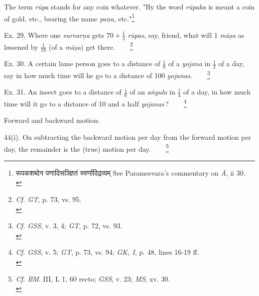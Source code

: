 \documentclass[10pt, openany]{book}
\begin{document}
{{{{{{{{{{{{{{{{{{{{\begin{sloppypar}
\newpage

{\small The term  \textit{rūpa} stands for any coin whatever. "By the word  \textit{rūpaka} is meant a coin of gold, etc., bearing the name  \textit{paṇa}, etc."\renewcommand{\thefootnote}{1}\footnote{\hspace{-2mm} {\s रूपकशब्देन पणादिसञ्ज्ञितं स्वर्णादिद्रव्यम्} {\en See Paramesvara's commentary on \textit{Ā}, ii 30.}\\}}
\vspace{3mm}

Ex. 29. Where one  \textit{survarṇa} gets $70 + \frac{1}{3}$  \textit{rūpas}, say,
friend, what will 1  \textit{māṣa} as lessened by $\frac{1}{10}$ (of a  \textit{māṣa}) get there.~\,~~~\renewcommand{\thefootnote}{\hspace{-4.5mm} 2}\footnote{\hspace{-2mm} \en \textit{Cf. GT}, p. 73, vs. 95.\\}
\vspace{3mm}

Ex. 30. A certain lame person goes to a distance of $\frac{1}{8}$
of a  \textit{yojana} in $\frac{1}{3}$ of a day, say in how much time will he go
to a distance of 100  \textit{yojanas}.~\,~~~\renewcommand{\thefootnote}{\hspace{-4.5mm} 3}\footnote{\hspace{-2mm} \en \textit{Cf. GSS}, v. 3, 4; \textit{GT}, p. 72, vs. 93.\\}
\vspace{3mm}

Ex. 31. An insect goes to a distance of $\frac{1}{6}$ of an  \textit{aṅgula} in
$\frac{1}{4}$ of a day, in how much time will it go to a distance of 10
and a half  \textit{yojanas}\,?~\,~~~\renewcommand{\thefootnote}{\hspace{-4.5mm} 4}\footnote{\hspace{-2mm} \en \textit{Cf. GSS}, v. 5; \textit{GT}, p. 73, vs. 94; \textit{GK, I}, p. 48, lines 16-19 ff.\\}
\vspace{4mm}

\noindent Forward and backward motion:
\vspace{3mm}

44(i). On subtracting the backward motion per day
from the forward motion per day, the remainder is the (true)
motion per day.~\,~~~\renewcommand{\thefootnote}{\hspace{-4.5mm} 5}\footnote{\hspace{-2mm} \en \textit{Cf. BM}. III, L 1, 60 recto; \textit{GSS}, v. 23; \textit{MS}, xv. 30.\\}
\vspace{3mm}


\end{sloppypar}}}}}}}}}}}}}}}}}}}}}
\end{document}
